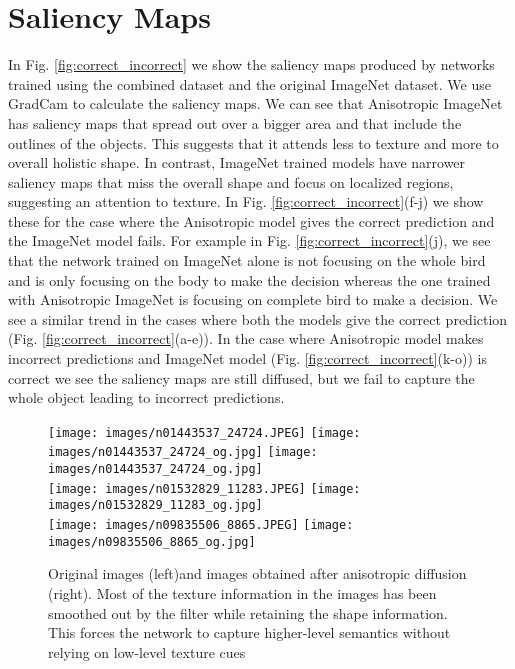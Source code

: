 \documentclass{bmvc2k}
\begin{document}
\section{Saliency Maps}
In Fig. \ref{fig:correct_incorrect} we show the saliency maps produced by networks trained using the combined dataset and the original ImageNet dataset. 
We use GradCam\cite{Selvaraju2016GradCAMVE} to calculate the saliency maps. We can see that Anisotropic ImageNet has saliency maps that spread out over a bigger area and that include the outlines of the objects.  This suggests that it attends less to texture and more to overall holistic shape.   In contrast, ImageNet trained models have narrower saliency maps that miss the overall shape and focus on localized regions, suggesting an attention to texture. In Fig. \ref{fig:correct_incorrect}(f-j) we show these for the case where the Anisotropic model gives the correct prediction and the ImageNet model fails.  For example in Fig. \ref{fig:correct_incorrect}(j), we see that the network trained on ImageNet alone is not focusing on the whole bird and is only focusing on the body to make the decision whereas the one trained with Anisotropic ImageNet is focusing on complete bird to make a decision.  We see a similar trend in the cases where both the models give the correct prediction (Fig. \ref{fig:correct_incorrect}(a-e)).  In the case where Anisotropic model makes incorrect predictions and ImageNet model (Fig. \ref{fig:correct_incorrect}(k-o)) is correct we see the saliency maps are still diffused, but we fail to capture the whole object leading to incorrect predictions. 



\begin{figure*}\centering
\centering
        \texttt{[image: images/n01443537\_24724.JPEG]}
        \texttt{[image: images/n01443537\_24724\_og.jpg]}
\centering
        \texttt{[image: images/n01443537\_24724\_og.jpg]}
\\
\centering
        \texttt{[image: images/n01532829\_11283.JPEG]}
\centering
        \texttt{[image: images/n01532829\_11283\_og.jpg]}
\\
\centering
        \texttt{[image: images/n09835506\_8865.JPEG]}
\centering
        \texttt{[image: images/n09835506\_8865\_og.jpg]}
\caption{Original images (left)and images obtained after anisotropic diffusion (right). Most of the texture information in the images has been smoothed out by the filter while retaining the shape information. This forces the network to capture higher-level semantics without relying on low-level texture cues}
    \label{fig:example1}
    \end{figure*}
    
\end{document}
